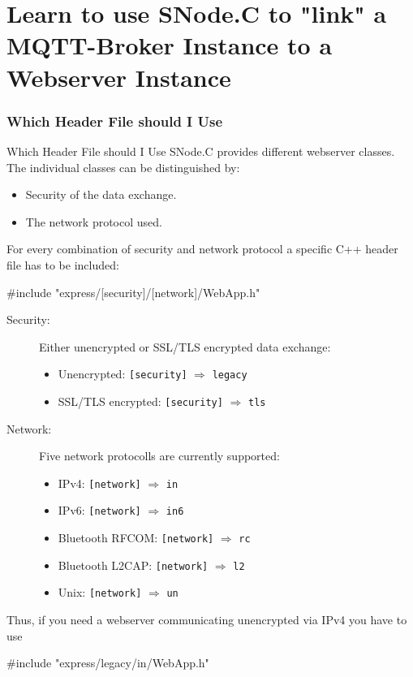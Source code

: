 ﻿\part{Learn to use SNode.C to "link" a MQTT-Broker Instance to a Webserver Instance}
\section[nosectionpage]{Which Header File should I Use}

\begin{frame}[fragile]{Which Header File should I Use}
  SNode.C provides different webserver classes. The individual classes can be distinguished by:
  \begin{itemize}
    \item Security of the data exchange.
    \item The network protocol used.
  \end{itemize}
  For every combination of security and network protocol a specific C++ header file has to be included:
  \begin{cppcode}[gobble=4]
    #include "express/[security]/[network]/WebApp.h"
  \end{cppcode}
  \begin{description}
    \item[Security:] Either unencrypted or SSL/TLS encrypted data exchange:
    \begin{itemize}
      \item Unencrypted: \texttt{\textcolor{fh-ooe-red}{[security]}} $\Rightarrow$ \texttt{\textcolor{fh-ooe-red}{legacy}}
      \item SSL/TLS encrypted: \texttt{\textcolor{fh-ooe-red}{[security]}} $\Rightarrow$ \texttt{\textcolor{fh-ooe-red}{tls}}
    \end{itemize}
    \item[Network:] Five network protocolls are currently supported:
    \begin{itemize}
      \item IPv4: \texttt{\textcolor{fh-ooe-red}{[network]}} $\Rightarrow$ \texttt{\textcolor{fh-ooe-red}{in}}
      \item IPv6: \texttt{\textcolor{fh-ooe-red}{[network]}} $\Rightarrow$ \texttt{\textcolor{fh-ooe-red}{in6}}
      \item Bluetooth RFCOM: \texttt{\textcolor{fh-ooe-red}{[network]}} $\Rightarrow$ \texttt{\textcolor{fh-ooe-red}{rc}}
      \item Bluetooth L2CAP: \texttt{\textcolor{fh-ooe-red}{[network]}} $\Rightarrow$ \texttt{\textcolor{fh-ooe-red}{l2}}
      \item Unix: \texttt{\textcolor{fh-ooe-red}{[network]}} $\Rightarrow$ \texttt{\textcolor{fh-ooe-red}{un}}
    \end{itemize}
  \end{description}
  \vspace{0.5cm}
  Thus, if you need a webserver communicating unencrypted via IPv4 you have to use
  \begin{cppcode}[gobble=4]
    #include "express/legacy/in/WebApp.h"
  \end{cppcode}
\end{frame}
